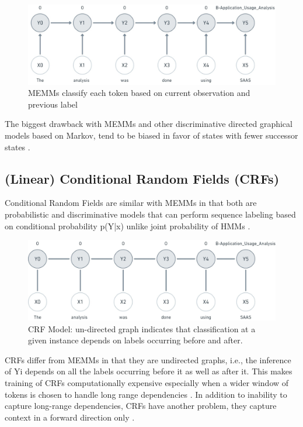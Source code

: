 \begin{figure}[htbp]
	\centering
	\includegraphics[width=1\textwidth]{4.graphics/figures/ch_5/MEMM}
	\caption{MEMMs classify each token based on current observation and previous label}
	\label{fig:chapter03:setup}
\end{figure}

The biggest drawback with MEMMs and other discriminative directed graphical models based on Markov, tend to be biased in favor of states with fewer successor states \citep{lafferty2001conditional}. 

\subsection{(Linear) Conditional Random Fields (\ac{CRF}s)}
\label{sec:chapter05:MLModels:CRFs}

Conditional Random Fields are similar with \ac{MEMM}s in that both are probabilistic and discriminative models that can perform sequence labeling based on conditional probability p(Y|x) unlike joint probability of \ac{HMM}s \citep{wallach2004conditional}. 

\begin{figure}[htbp]
	\centering
	\includegraphics[width=1\textwidth]{4.graphics/figures/ch_5/CRF}
	\caption{\ac{CRF} Model: un-directed graph indicates that classification at a given instance depends on labels occurring before and after.}
	\label{fig:chapter03:setup}
\end{figure}

\ac{CRF}s differ from \ac{MEMM}s in that they are undirected graphs, i.e., the inference of Yi depends on all the labels occurring before it as well as after it. This makes training of CRFs computationally expensive especially when a wider window of tokens is chosen to handle long range dependencies \citep{aggarwal2018machine}. In addition to inability to capture long-range dependencies, CRFs have another problem, they capture context in a forward direction only \citep{lample2016neural}.



